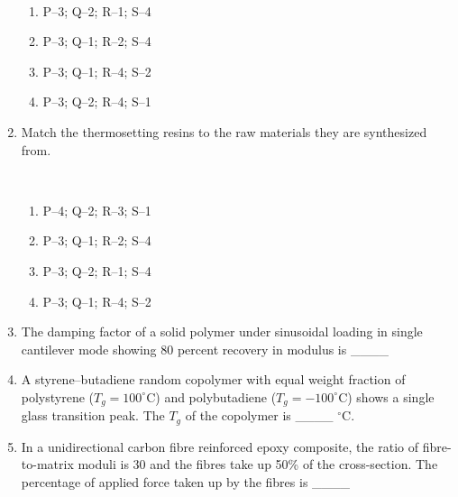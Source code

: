 \documentclass[journal,12pt,onecolumn]{IEEEtran}
\begin{document}
\begin{enumerate}[label=\arabic*)]


\hfill{} \\

\vspace{0.2cm}
\begin{enumerate}[label=\alph*)]
\item P–3; Q–2; R–1; S–4
\item P–3; Q–1; R–2; S–4
\item P–3; Q–1; R–4; S–2
\item P–3; Q–2; R–4; S–1
\end{enumerate}

\newpage

\item Match the thermosetting resins to the raw materials they are synthesized from.



\hfill{} \\

\vspace{0.2cm}
\begin{enumerate}[label=\alph*)]
\item P–4; Q–2; R–3; S–1
\item P–3; Q–1; R–2; S–4
\item P–3; Q–2; R–1; S–4
\item P–3; Q–1; R–4; S–2
\end{enumerate}

\vspace{0.5cm}

\item The damping factor of a solid polymer under sinusoidal loading in single cantilever mode showing 80 percent recovery in modulus is \_\_\_\_
\hfill{} \\
\vspace{0.5cm}

\item A styrene–butadiene random copolymer with equal weight fraction of polystyrene ($T_g=100^\circ$C) and polybutadiene ($T_g=-100^\circ$C) shows a single glass transition peak. The $T_g$ of the copolymer is \_\_\_\_ $^\circ$C.
\hfill{} \\
\vspace{0.5cm}

\item In a unidirectional carbon fibre reinforced epoxy composite, the ratio of fibre-to-matrix moduli is 30 and the fibres take up 50\% of the cross-section. The percentage of applied force taken up by the fibres is \_\_\_\_
\hfill{} \\


\end{enumerate}
\end{document}
